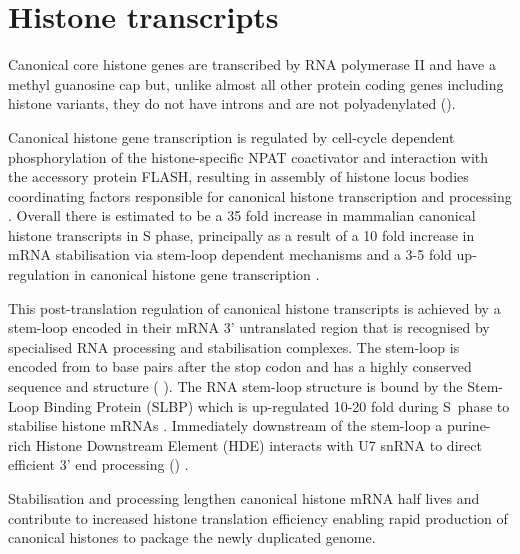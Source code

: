 \section{Histone transcripts}
  
	Canonical core histone genes are transcribed by RNA polymerase II 
	and have a methyl guanosine cap \citep{MarzluffNatRevGen2008}
	but, unlike almost all other protein coding genes including histone variants, 
	they do not have introns and are not polyadenylated ().

	Canonical histone gene transcription is regulated 
	by cell-cycle dependent phosphorylation of the histone-specific NPAT coactivator 
	and interaction with the accessory protein FLASH, 
	resulting in assembly of histone locus bodies 
	coordinating factors responsible for canonical histone transcription and processing \citep{MarzluffNatRevGen2008,RattrayMueller2012,Hoefig2014}.
	Overall there is estimated to be a 35 fold increase in mammalian canonical histone transcripts in S phase,
	principally as a result of a 10 fold increase in mRNA stabilisation via stem-loop dependent mechanisms 
	and a 3-5 fold up-regulation in canonical histone gene transcription \citep{HarrisMCB1991}.

	This post-translation regulation of canonical histone transcripts 
	is achieved by a stem-loop encoded in their mRNA 3' untranslated region 
	that is recognised by specialised RNA processing and stabilisation complexes.
	The stem-loop is encoded from \StemLoopStart{} to \StemLoopEnd{} base pairs after the stop codon 
	and has a highly conserved sequence and structure ( \citep{stem-loop-structure}).
	The RNA stem-loop structure is bound by the Stem-Loop Binding Protein (SLBP) 
	which is up-regulated 10-20 fold during S~phase to stabilise histone mRNAs \citep{SLBP-regulation}. 
	Immediately downstream of the stem-loop a purine-rich Histone Downstream Element (HDE) 
	interacts with U7 snRNA to direct efficient 3' end processing () \citep{HDE-sequence}.
  \begin{figure*}
    \centering
    \hfill
  \end{figure*}

	Stabilisation and processing lengthen canonical histone mRNA half lives 
	and contribute to increased histone translation efficiency 
	enabling rapid production of canonical histones to package the newly duplicated genome.

